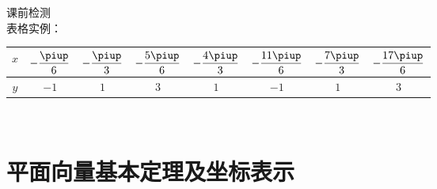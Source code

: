   \newtheorem*{Theorem}{定理}
  \makefront
\vspace{-1.5em}


\startexercise
\begin{exercise}{\heiti 课前检测}\\
  表格实例：
  \begin{center}
    \renewcommand{\arraystretch}{1.4}
    \begin{tabular}{|*{8}{c|}}
      \hline
        $x$
        &$-\dfrac{\piup}6$
        &$-\dfrac{\piup}3$
        &$-\dfrac{5\piup}6$
        &$-\dfrac{4\piup}3$
        &$-\dfrac{11\piup}6$
        &$-\dfrac{7\piup}3$
        &$-\dfrac{17\piup}6$\\
      \hline
        $y$
        &$-1$
        &$1$
        &$3$
        &$1$
        &$-1$
        &$1$
        &$3$\\
      \hline
    \end{tabular}\\
  \end{center}
\end{exercise}

\section{平面向量基本定理及坐标表示}
